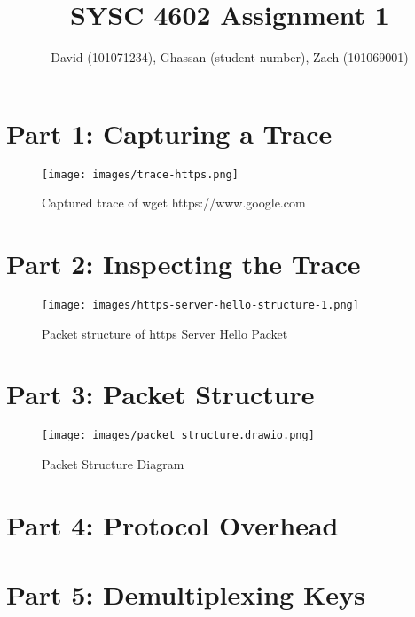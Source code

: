 \documentclass{report}
\begin{document}
    \title  { \textbf{SYSC 4602 Assignment 1} }
    \author {
        David (101071234),
        Ghassan (student number),
        Zach (101069001)
    }

    \maketitle

    \chapter*{Part 1: Capturing a Trace}
    \begin{figure}[h]
        \texttt{[image: images/trace-https.png]}
        \caption{Captured trace of wget https://www.google.com}
    \end{figure}

    \chapter*{Part 2: Inspecting the Trace}
    \begin{figure}[h]
        \texttt{[image: images/https-server-hello-structure-1.png]}
        \caption{Packet structure of https Server Hello Packet}
    \end{figure}

    \chapter*{Part 3: Packet Structure}
    \begin{figure}[h]
        \texttt{[image: images/packet\_structure.drawio.png]}
        \caption{Packet Structure Diagram}
    \end{figure}
    \chapter*{Part 4: Protocol Overhead}

    \chapter*{Part 5: Demultiplexing Keys}
\end{document}
